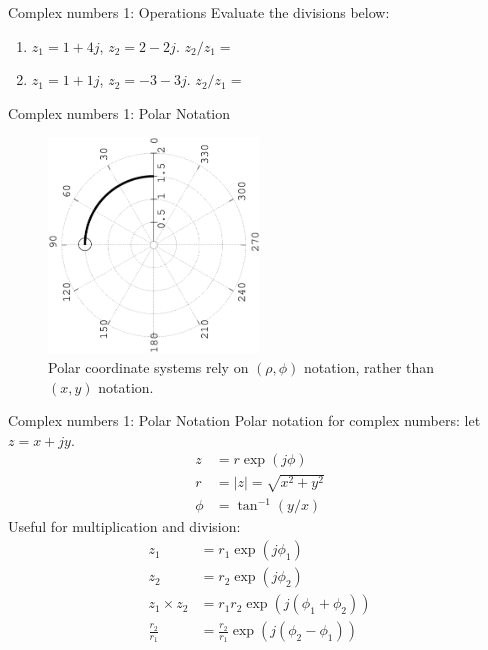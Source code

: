 \documentclass{beamer}
\begin{document}
\begin{frame}{Complex numbers 1: Operations}
Evaluate the divisions below:
\begin{enumerate}
\item $z_1 = 1+4j$, $z_2 = 2-2j$.  $z_2/z_1 = $
\item $z_1 = 1+1j$, $z_2 = -3-3j$.  $z_2/z_1 = $
\end{enumerate}
\end{frame}

\begin{frame}{Complex numbers 1: Polar Notation}
\begin{figure}
\centering
\includegraphics[width=0.5\textwidth,angle=270,trim=4cm 2cm 0cm 0cm]{figures/polar.eps}
\caption{\label{fig:complex3} Polar coordinate systems rely on $(\rho,\phi)$ notation, rather than $(x,y)$ notation.}
\end{figure}
\end{frame}

\begin{frame}{Complex numbers 1: Polar Notation}
Polar notation for complex numbers: let $z = x+jy$.
\begin{align}
z &= r \exp(j\phi) \\
r &= |z| = \sqrt{x^2 + y^2} \\
\phi &= \tan^{-1}(y/x)
\end{align}
Useful for multiplication and division:
\begin{align}
z_1 &= r_1 \exp(j\phi_1) \\
z_2 &= r_2 \exp(j\phi_2) \\
z_1 \times z_2 &= r_1 r_2 \exp(j(\phi_1 + \phi_2)) \\
\frac{r_2}{r_1} &= \frac{r_2}{r_1} \exp(j(\phi_2 - \phi_1))
\end{align}
\end{frame}
\end{document}

